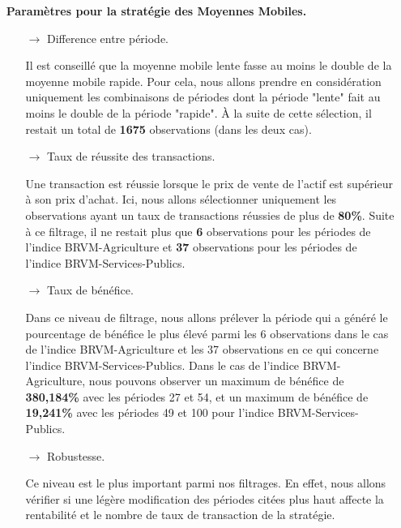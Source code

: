 \begin{itemize}

    \item[\ding{226}] \textbf{Paramètres pour la stratégie des Moyennes Mobiles.}
    \begin{itemize}
    \item[$\rightarrow$] Difference entre période.
    \par{Il est conseillé que la moyenne mobile lente fasse au moins le double de la moyenne mobile
    rapide. Pour cela, nous allons prendre en considération uniquement les combinaisons de périodes
    dont la période "lente" fait au moins le double de la période "rapide".
    À la suite de cette sélection, il restait un total de \textbf{1675} observations (dans les deux cas). }
    
    \item[$\rightarrow$] Taux de réussite des transactions.
    \par{Une transaction est réussie lorsque le prix de vente de l'actif est supérieur à son prix d'achat.
    Ici, nous allons sélectionner uniquement les observations ayant un taux de transactions réussies de 
    plus de \textbf{80\%}. Suite à ce filtrage, il ne restait plus que \textbf{6} observations pour les périodes de 
    l'indice BRVM-Agriculture et \textbf{37} observations pour les périodes de l'indice BRVM-Services-Publics.}
    
    \item[$\rightarrow$] Taux de bénéfice.
    \par{Dans ce niveau de filtrage, nous allons prélever la période qui a généré le pourcentage de bénéfice le plus
    élevé parmi les 6 observations dans le cas de l'indice BRVM-Agriculture et les 37 observations en ce qui 
    concerne l'indice BRVM-Services-Publics.
    Dans le cas de l'indice BRVM-Agriculture, nous pouvons observer un maximum de bénéfice de \textbf{380,184\%}
    avec les périodes 27 et 54, et un maximum de bénéfice de \textbf{19,241\%} avec les périodes 49 et 100 pour 
    l'indice BRVM-Services-Publics.}
    
    \item[$\rightarrow$] Robustesse.
    \par{Ce niveau est le plus important parmi nos filtrages. En effet, nous allons vérifier
    si une légère modification des périodes citées plus haut affecte la rentabilité et le nombre de taux de transaction 
    de la stratégie.}
    
    
    

\end{itemize}
\end{itemize}
